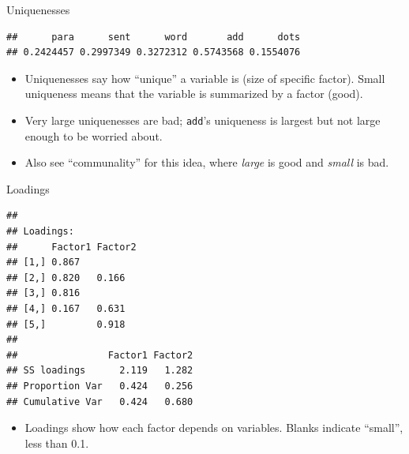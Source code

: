 \documentclass[ignorenonframetext,]{beamer}
\newenvironment{Shaded}{\begin{snugshade}}{\end{snugshade}}
\newcommand{\NormalTok}[1]{#1}
\newcommand{\OperatorTok}[1]{\textcolor[rgb]{0.81,0.36,0.00}{\textbf{#1}}}
\providecommand{\tightlist}{%
  \setlength{\itemsep}{0pt}\setlength{\parskip}{0pt}}
\begin{document}
\begin{frame}[fragile]{Uniquenesses}
\protect\hypertarget{uniquenesses}{}

\begin{Shaded}
\end{Shaded}

\begin{verbatim}
##      para      sent      word       add      dots 
## 0.2424457 0.2997349 0.3272312 0.5743568 0.1554076
\end{verbatim}

\begin{itemize}
\item
  Uniquenesses say how ``unique'' a variable is (size of specific
  factor). Small uniqueness means that the variable is summarized by a
  factor (good).
\item
  Very large uniquenesses are bad; \texttt{add}'s uniqueness is largest
  but not large enough to be worried about.
\item
  Also see ``communality'' for this idea, where \emph{large} is good and
  \emph{small} is bad.
\end{itemize}

\end{frame}

\begin{frame}[fragile]{Loadings}
\protect\hypertarget{loadings}{}

\footnotesize

\begin{Shaded}
\end{Shaded}

\begin{verbatim}
## 
## Loadings:
##      Factor1 Factor2
## [1,] 0.867          
## [2,] 0.820   0.166  
## [3,] 0.816          
## [4,] 0.167   0.631  
## [5,]         0.918  
## 
##                Factor1 Factor2
## SS loadings      2.119   1.282
## Proportion Var   0.424   0.256
## Cumulative Var   0.424   0.680
\end{verbatim}

\normalsize

\begin{itemize}
\tightlist
\item
  Loadings show how each factor depends on variables. Blanks indicate
  ``small'', less than 0.1.
\end{itemize}

\end{frame}
\end{document}
